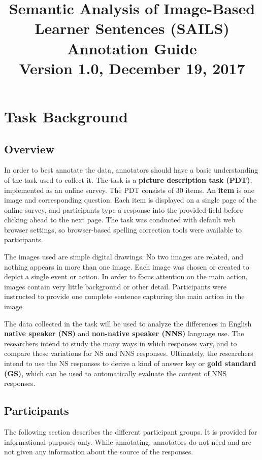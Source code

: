\documentclass[12pt,notitlepage]{article}
\title{\large{Semantic Analysis of Image-Based Learner Sentences (SAILS)} \\ Annotation Guide \\ Version 1.0, December 19, 2017}
\date{}
\begin{document}
\maketitle
\tableofcontents

\section{Task Background} \label{sec:background}

\subsection{Overview}
In order to best annotate the data, annotators should have a basic understanding of the task used to collect it. The task is a \textbf{picture description task (PDT)}, implemented as an online survey. The PDT consists of 30 items. An \textbf{item} is one image and corresponding question. Each item is displayed on a single page of the online survey, and participants type a response into the provided field before clicking ahead to the next page. The task was conducted with default web browser settings, so browser-based spelling correction tools were available to participants.

The images used are simple digital drawings. No two images are related, and nothing appears in more than one image. Each image was chosen or created to depict a single event or action. In order to focus attention on the main action, images contain very little background or other detail. Participants were instructed to provide one complete sentence capturing the main action in the image. 

The data collected in the task will be used to analyze the differences in English \textbf{native speaker (NS)} and \textbf{non-native speaker (NNS)} language use. The researchers intend to study the many ways in which responses vary, and to compare these variations for NS and NNS responses. Ultimately, the researchers intend to use the NS responses to derive a kind of answer key or \textbf{gold standard (GS)}, which can be used to automatically evaluate the content of NNS responses.

\subsection{Participants}
The following section describes the different participant groups. It is provided for informational purposes only. While annotating, annotators do not need and are not given any information about the source of the responses.
\end{document}

